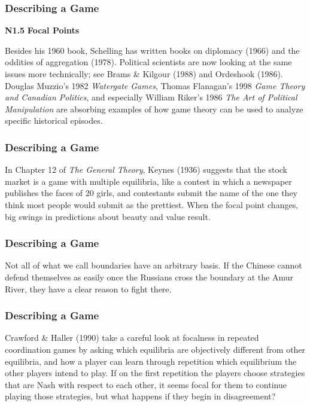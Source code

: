  \begin{frame}[fragile]\frametitle{Describing a Game}
 

 {\bf N1.5 } {\bf Focal Points}

Besides his 1960 book, Schelling has written books on diplomacy (1966) and the
oddities of aggregation (1978). Political scientists are now looking at the same
issues more technically; see Brams \& Kilgour (1988) and Ordeshook (1986).
Douglas Muzzio's 1982  {\it Watergate Games}, Thomas Flanagan's 1998 {\it
Game Theory and Canadian Politics}, and especially William   Riker's 1986 {\it
The Art of Political Manipulation} are  absorbing examples of   how game theory
can be used to analyze   specific historical episodes.

 \end{frame}
 \begin{frame}[fragile]\frametitle{Describing a Game}
 
  In Chapter 12 of {\it The General Theory}, Keynes (1936) suggests that
the stock market is a game with multiple equilibria, like a contest in which a
newspaper publishes the faces of 20 girls, and contestants submit the name of
the one they think most people would submit as the prettiest. When the focal
point changes, big swings in predictions about beauty and value  result.

  \end{frame}
 \begin{frame}[fragile]\frametitle{Describing a Game}
 
 Not all of what we call boundaries have an arbitrary basis. If the
Chinese cannot defend themselves as easily once the Russians cross the boundary
at the Amur River, they have a clear reason to fight there.

\end{frame}
 \begin{frame}[fragile]\frametitle{Describing a Game}
 
 Crawford \& Haller (1990)  take a careful look at focalness in  repeated
coordination games by asking which equilibria are objectively different from
other equilibria, and how a player can learn through repetition which
equilibrium  the other players intend to play. If on the first repetition  the
players choose strategies that are Nash with respect to each other, it seems
focal for them to continue playing those strategies, but what happens if they
begin in disagreement?

\end{frame}
